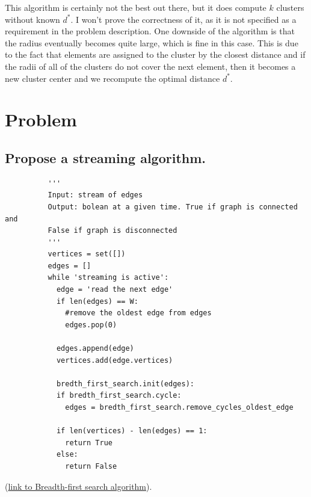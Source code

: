 \documentclass[11pt,a4paper,english]{article}
\begin{document}
        This algorithm is certainly not the best out there, but it does compute $k$ clusters without known $d^*$. I won't prove the correctness of it, as it is not specified as a requirement in the problem description. One downside of the algorithm is that the radius eventually becomes quite large, which is fine in this case. This is due to the fact that elements are assigned to the cluster by the closest distance and if the radii of all of the clusters do not cover the next element, then it becomes a new cluster center and we recompute the optimal distance $d^*$.

    \section{Problem}
      \subsection{Propose a streaming algorithm.}

        \begin{verbatim}
          '''
          Input: stream of edges
          Output: bolean at a given time. True if graph is connected and
          False if graph is disconnected
          '''
          vertices = set([])
          edges = []
          while 'streaming is active':
            edge = 'read the next edge'
            if len(edges) == W:
              #remove the oldest edge from edges
              edges.pop(0)

            edges.append(edge)
            vertices.add(edge.vertices)

            bredth_first_search.init(edges):
            if bredth_first_search.cycle:
              edges = bredth_first_search.remove_cycles_oldest_edge

            if len(vertices) - len(edges) == 1:
              return True
            else:
              return False
        \end{verbatim}
        (\href{https://en.wikipedia.org/wiki/Breadth-first_search}{link to Breadth-first search algorithm}).
\end{document}
